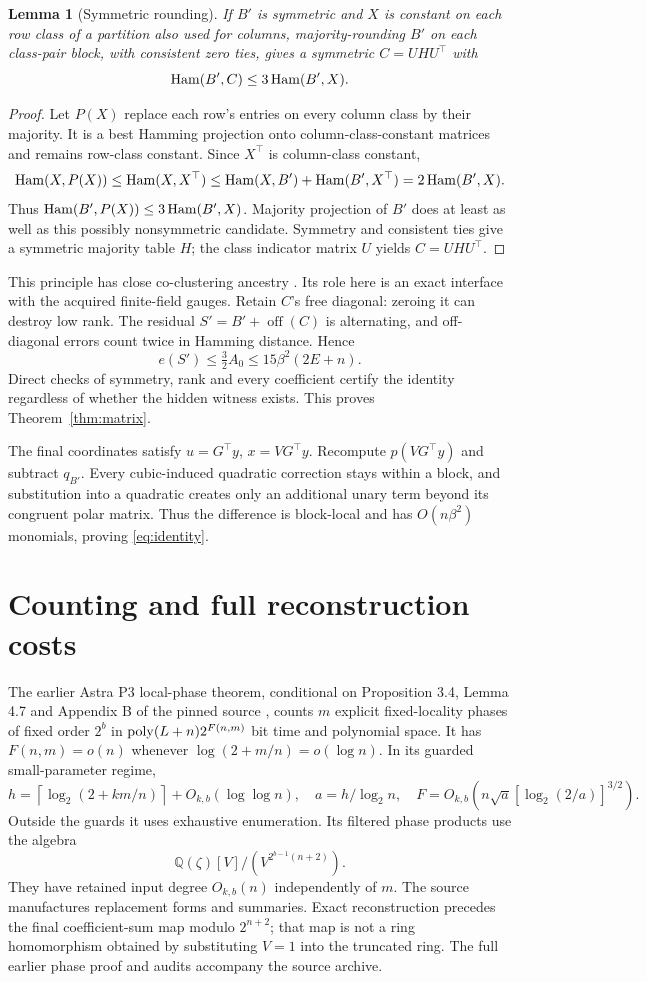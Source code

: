 \documentclass[11pt,a4paper]{article}
\newtheorem{lemma}[theorem]{Lemma}
\newcommand{\Q}{\mathbb Q}\newcommand{\C}{\mathbb C}
\newcommand{\off}{\operatorname{off}}\newcommand{\diag}{\operatorname{diag}}
\begin{document}
\begin{lemma}[Symmetric rounding]\label{lem:round}
If $B'$ is symmetric and $X$ is constant on each row class of a
partition also used for columns, majority-rounding $B'$ on each
class-pair block, with consistent zero ties, gives a symmetric
$C=UHU^\top$ with
\[
\operatorname{Ham}(B',C)\le3\operatorname{Ham}(B',X).
\]
\end{lemma}
\begin{proof}
Let $P(X)$ replace each row's entries on every column class by their
majority. It is a best Hamming projection onto column-class-constant
matrices and remains row-class constant. Since $X^\top$ is
column-class constant,
\[
\operatorname{Ham}(X,P(X))\le\operatorname{Ham}(X,X^\top)
\le\operatorname{Ham}(X,B')+\operatorname{Ham}(B',X^\top)=2\operatorname{Ham}(B',X).
\]
Thus $\operatorname{Ham}(B',P(X))\le3\operatorname{Ham}(B',X)$. Majority projection of $B'$
does at least as well as this possibly nonsymmetric candidate.
Symmetry and consistent ties give a symmetric majority table $H$;
the class indicator matrix $U$ yields $C=UHU^\top$.
\end{proof}

This principle has close co-clustering ancestry
\cite[Theorem 3.6]{cocluster}. Its role here is an exact interface
with the acquired finite-field gauges.
Retain $C$'s free diagonal: zeroing it can destroy low rank.
The residual $S'=B'+\off(C)$ is alternating, and off-diagonal
errors count twice in Hamming distance. Hence
\[
e(S')\le\tfrac32 A_0\le15\beta^2(2E+n).
\]
Direct checks of symmetry, rank and every coefficient certify the
identity regardless of whether the hidden witness exists. This
proves Theorem~\ref{thm:matrix}.

The final coordinates satisfy $u=G^\top y$, $x=VG^\top y$.
Recompute $p(VG^\top y)$ and subtract $q_{B'}$.
Every cubic-induced quadratic correction stays within a block,
and substitution into a quadratic creates only an additional
unary term beyond its congruent polar matrix. Thus the difference
is block-local and has $O(n\beta^2)$ monomials, proving
\eqref{eq:identity}.

\section{Counting and full reconstruction costs}
\label{sec:count}
The earlier Astra P3 local-phase theorem, conditional on
Proposition 3.4, Lemma 4.7 and Appendix B of the pinned source
\cite{governing}, counts $m$ explicit fixed-locality phases of fixed
order $2^b$ in $\operatorname{poly}(L+n)2^{F(n,m)}$ bit time and polynomial
space. It has $F(n,m)=o(n)$ whenever
$\log(2+m/n)=o(\log n)$. In its guarded small-parameter regime,
\[
h=\left\lceil\log_2(2+km/n)\right\rceil+O_{k,b}(\log\log n),
\quad a=h/\log_2 n,\quad
F=O_{k,b}\!\left(n\sqrt a[\log_2(2/a)]^{3/2}\right).
\]
Outside the guards it uses exhaustive enumeration.
Its filtered phase products use the algebra
\[
\Q(\zeta)[V]/(V^{2^{b-1}(n+2)}).
\]
They have retained input degree
$O_{k,b}(n)$ independently of $m$. The source manufactures
replacement forms and summaries. Exact reconstruction precedes
the final coefficient-sum map modulo $2^{n+2}$; that map is not
a ring homomorphism obtained by substituting $V=1$ into the
truncated ring. The full earlier phase proof and audits accompany
the source archive.
\end{document}
